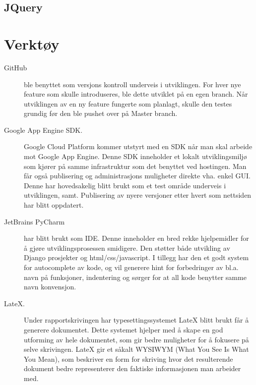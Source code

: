 \subsection{JQuery}


\section{Verktøy}
\begin{description}
\item[GitHub]ble benyttet som versjons kontroll underveis i utviklingen. For hver nye feature som skulle introduseres, ble dette utviklet på en egen branch. Når utviklingen av en ny feature fungerte som planlagt, skulle den testes grundig før den ble pushet over på Master branch.
\item[Google App Engine SDK.] Google Cloud Platform kommer utstyrt med en SDK når man skal arbeide mot Google App Engine. Denne SDK inneholder et lokalt utviklingsmiljø som kjører på samme infrastruktur som det benyttet ved hostingen. Man får også publisering og administrasjons muligheter direkte vha. enkel GUI. Denne har hovedsakelig blitt brukt som et test område underveis i utviklingen, samt. Publisering av nyere versjoner etter hvert som nettsiden har blitt oppdatert.
\item[JetBrains PyCharm] har blitt brukt som IDE. Denne inneholder en bred rekke hjelpemidler for å gjøre utviklingsprosessen smidigere. Den støtter både utvikling av Django prosjekter og html/css/javascript. I tillegg har den et godt system for autocomplete av kode, og vil generere hint for forbedringer av bl.a. navn på funksjoner, indentering og sørger for at all kode benytter samme navn konvensjon.
\item[LateX.]Under rapportskrivingen har typesettingssystemet LateX blitt brukt får å generere dokumentet. Dette systemet hjelper med å skape en god utforming av hele dokumentet, som gir bedre muligheter for å fokusere på selve skrivingen. LateX gir et såkalt WYSIWYM (What You See Is What You Mean), som beskriver en form for skriving hvor det resulterende dokument bedre representerer den faktiske informasjonen man arbeider med.



\end{description}

